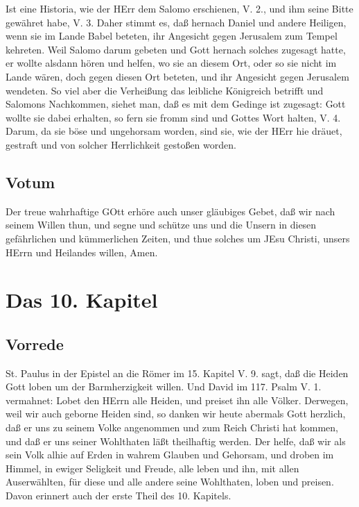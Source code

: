 Ist eine Historia, wie der HErr dem Salomo erschienen, V. 2., und ihm seine Bitte gewähret habe, V. 3. Daher stimmt es, daß hernach Daniel und andere Heiligen, wenn sie im Lande Babel beteten, ihr Angesicht gegen Jerusalem zum Tempel kehreten. Weil Salomo darum gebeten und Gott hernach solches zugesagt hatte, er wollte alsdann hören und helfen, wo sie an diesem Ort, oder so sie nicht im Lande wären, doch gegen diesen Ort beteten, und ihr Angesicht gegen Jerusalem wendeten. So viel aber die Verheißung das leibliche Königreich betrifft und Salomons Nachkommen, siehet man, daß es mit dem Gedinge ist zugesagt: Gott wollte sie dabei erhalten, so fern sie fromm sind und Gottes Wort halten, V. 4. Darum, da sie böse und ungehorsam worden, sind sie, wie der HErr hie dräuet, gestraft und von solcher Herrlichkeit gestoßen worden.

\section{Votum}

Der treue wahrhaftige GOtt erhöre auch unser gläubiges Gebet, daß wir nach seinem Willen thun, und segne und schütze uns und die Unsern in diesen gefährlichen und kümmerlichen Zeiten, und thue solches um JEsu Christi, unsers HErrn und Heilandes willen, Amen.

\chapter{Das 10. Kapitel}

\section{Vorrede}

St. Paulus in der Epistel an die Römer im 15. Kapitel V. 9. sagt, daß die Heiden Gott loben um der Barmherzigkeit willen. Und David im 117. Psalm V. 1. vermahnet: Lobet den HErrn alle Heiden, und preiset ihn alle Völker. Derwegen, weil wir auch geborne Heiden sind, so danken wir heute abermals Gott herzlich, daß er uns zu seinem Volke angenommen und zum Reich Christi hat kommen, und daß er uns seiner Wohlthaten läßt theilhaftig werden. Der helfe, daß wir als sein Volk alhie auf Erden in wahrem Glauben und Gehorsam, und droben im Himmel, in ewiger Seligkeit und Freude, alle leben und ihn, mit allen Auserwählten, für diese und alle andere seine Wohlthaten, loben und preisen. Davon erinnert auch der erste Theil des 10. Kapitels.

